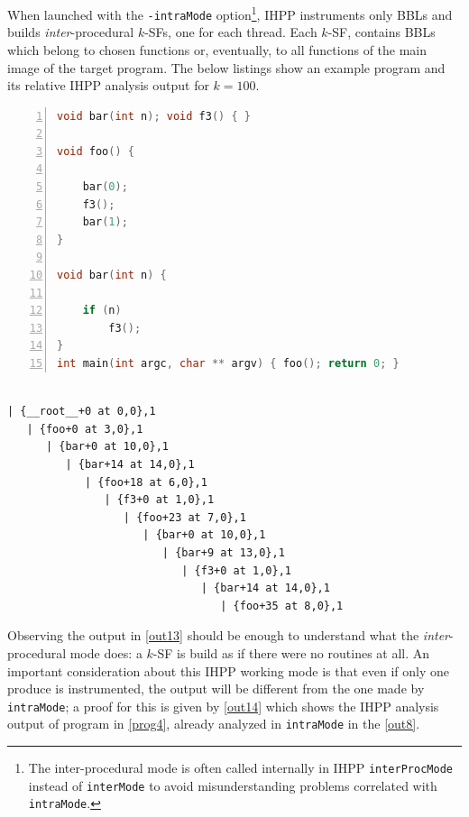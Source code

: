 \documentclass[a4paper,10pt]{report}
\begin{document}
When launched with the \verb|-intraMode| option\footnote{The inter-procedural mode is often called internally in IHPP \texttt{interProcMode} instead of \texttt{interMode} to 
avoid misunderstanding problems correlated with \texttt{intraMode}.}, 
IHPP instruments only BBLs and builds \emph{inter}-procedural $k$-SFs, one for each thread. 
Each $k$-SF, contains BBLs which belong to chosen functions or, eventually, to all 
functions of the main image of the target program. The below listings show 
an example program and its relative IHPP analysis output for $k=100$.

\begin{lstlisting}[language=C, 
	caption={prog6.c, an example program}, label=prog6, frame=leftline, numbers=left]
void bar(int n); void f3() { }

void foo() { 

	bar(0); 
	f3(); 
	bar(1); 
}

void bar(int n) { 

	if (n) 
		f3(); 
}
int main(int argc, char ** argv) { foo(); return 0; }
\end{lstlisting}

\begin{lstlisting}[label=out13, frame=bottomline,
caption={partial output of IHPP analysis in \texttt{interProcMode} of \texttt{prog6}}]

| {__root__+0 at 0,0},1
   | {foo+0 at 3,0},1
      | {bar+0 at 10,0},1
         | {bar+14 at 14,0},1
            | {foo+18 at 6,0},1
               | {f3+0 at 1,0},1
                  | {foo+23 at 7,0},1
                     | {bar+0 at 10,0},1
                        | {bar+9 at 13,0},1
                           | {f3+0 at 1,0},1
                              | {bar+14 at 14,0},1
                                 | {foo+35 at 8,0},1

\end{lstlisting}

Observing the output in \cref{out13} should be enough to understand what the 
\emph{inter}-procedural mode does: a $k$-SF is build as if there were no routines at all.
An important consideration about this IHPP working mode is that even if
only one produce is instrumented, the output will be different from the one made by 
\verb|intraMode|; a proof for this is given by \cref{out14} which shows
the IHPP analysis output of program in \cref{prog4}, 
already analyzed in \verb|intraMode| in the \cref{out8}.
\end{document}
